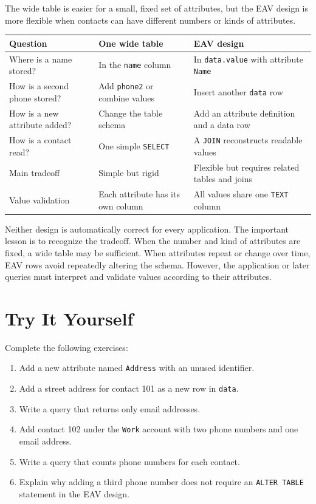 \documentclass[11pt]{article}
\begin{document}
The wide table is easier for a small, fixed set of attributes, but the EAV
design is more flexible when contacts can have different numbers or kinds of
attributes.

\begin{center}
\begin{tabular}{@{}>{\raggedright\arraybackslash}p{}
                    >{\raggedright\arraybackslash}p{}
                    >{\raggedright\arraybackslash}p{}@{}}
\toprule
Question & One wide table & EAV design \\
\midrule
Where is a name stored? & In the \texttt{name} column
    & In \texttt{data.value} with attribute \texttt{Name} \\
How is a second phone stored? & Add \texttt{phone2} or combine values
    & Insert another \texttt{data} row \\
How is a new attribute added? & Change the table schema
    & Add an attribute definition and a data row \\
How is a contact read? & One simple \texttt{SELECT}
    & A \texttt{JOIN} reconstructs readable values \\
Main tradeoff & Simple but rigid
    & Flexible but requires related tables and joins \\
Value validation & Each attribute has its own column
    & All values share one \texttt{TEXT} column \\
\bottomrule
\end{tabular}
\end{center}

Neither design is automatically correct for every application. The important
lesson is to recognize the tradeoff. When the number and kind of attributes are
fixed, a wide table may be sufficient. When attributes repeat or change over
time, EAV rows avoid repeatedly altering the schema. However, the application
or later queries must interpret and validate values according to their
attributes.

\section*{Try It Yourself}

Complete the following exercises:

\begin{enumerate}
    \item Add a new attribute named \texttt{Address} with an unused
          identifier.
    \item Add a street address for contact 101 as a new row in
          \texttt{data}.
    \item Write a query that returns only email addresses.
    \item Add contact 102 under the \texttt{Work} account with two phone numbers
          and one email address.
    \item Write a query that counts phone numbers for each contact.
    \item Explain why adding a third phone number does not require an
          \texttt{ALTER TABLE} statement in the EAV design.
\end{enumerate}
\end{document}
